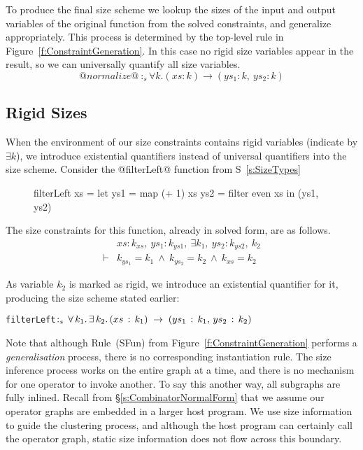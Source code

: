 To produce the final size scheme we lookup the sizes of the input and output variables of the original function from the solved constraints, and generalize appropriately. This process is determined by the top-level rule in Figure~\ref{f:ConstraintGeneration}. In this case no rigid size variables appear in the result, so we can universally quantify all size variables.
$$@normalize@ ~:_s \forall k. (xs : k) \to (ys_1 : k,~ ys_2 : k)
$$




\subsection{Rigid Sizes}
When the environment of our size constraints contains rigid variables (indicate by $\exists k$), we introduce existential quantifiers instead of universal quantifiers into the size scheme. Consider the @filterLeft@ function from S~\ref{s:SizeTypes}
\begin{figure}[H]
\begin{code}
      filterLeft xs
        = let ys1 = map (+ 1)   xs
              ys2 = filter even xs
          in (ys1, ys2)
\end{code}
\end{figure}
The size constraints for this function, already in solved form, are as follows.
$$
\begin{array}{ll}
       & xs : k_{xs},~ ys_1 : k_{ys1},~ \exists k_1,~ ys_2 : k_{ys2},~ k_2
\\
\vdash &          k_{ys_1} = k_1
        ~\wedge~  k_{ys_2} = k_2
        ~\wedge~  k_{xs}   = k_2
\end{array}
$$

As variable $k_2$ is marked as rigid, we introduce an existential quantifier for it, producing the size scheme stated earlier:

\begin{alltt}
   filterLeft \(:\sb{s}\,\forall\,k\sb{1}.\,\exists\,k\sb{2}.\,(xs\,:\,k\sb{1})\;\to\;(ys\sb{1}\,:\,k\sb{1},\,ys\sb{2}\,:\,k\sb{2})\)
\end{alltt}

Note that although Rule~(SFun) from Figure~\ref{f:ConstraintGeneration} performs a \emph{generalisation} process, there is no corresponding instantiation rule. The size inference process works on the entire graph at a time, and there is no mechanism for one operator to invoke another. To say this another way, all subgraphs are fully inlined. Recall from \S\ref{s:CombinatorNormalForm} that we assume our operator graphs are embedded in a larger host program. We use size information to guide the clustering process, and although the host program can certainly call the operator graph, static size information does not flow across this boundary.

